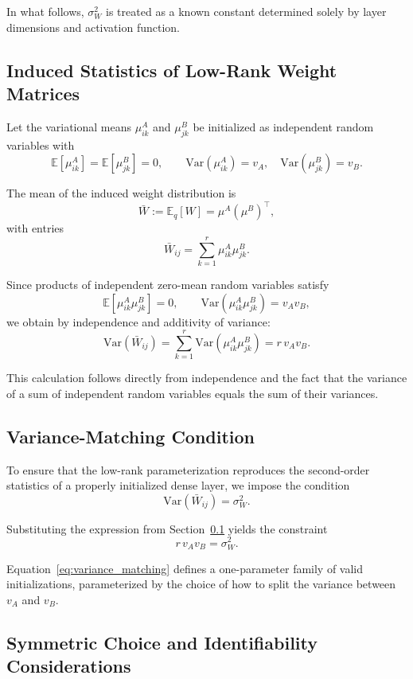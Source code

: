 \documentclass{article}
\theoremstyle{plain}
\theoremstyle{definition}
\theoremstyle{remark}
\begin{document}
In what follows, $\sigma_W^2$ is treated as a known constant determined solely by layer dimensions and activation function.

\subsection{Induced Statistics of Low-Rank Weight Matrices}\label{app:init:induced_stats}

Let the variational means $\mu^A_{ik}$ and $\mu^B_{jk}$ be initialized as independent random variables with
\[
\mathbb{E}[\mu^A_{ik}] = \mathbb{E}[\mu^B_{jk}] = 0,
\qquad
\mathrm{Var}(\mu^A_{ik}) = v_A,
\quad
\mathrm{Var}(\mu^B_{jk}) = v_B.
\]

The mean of the induced weight distribution is
\[
\bar{W} := \mathbb{E}_q[W] = \mu^A (\mu^B)^\top,
\]
with entries
\[
\bar{W}_{ij} = \sum_{k=1}^r \mu^A_{ik} \mu^B_{jk}.
\]

Since products of independent zero-mean random variables satisfy
\[
\mathbb{E}[\mu^A_{ik} \mu^B_{jk}] = 0,
\qquad
\mathrm{Var}(\mu^A_{ik} \mu^B_{jk}) = v_A v_B,
\]
we obtain by independence and additivity of variance:
\[
\mathrm{Var}(\bar{W}_{ij})
= \sum_{k=1}^r \mathrm{Var}(\mu^A_{ik} \mu^B_{jk})
= r \, v_A v_B.
\]

This calculation follows directly from independence and the fact that the variance of a sum of independent random variables equals the sum of their variances.

\subsection{Variance-Matching Condition}\label{app:init:variance_matching}

To ensure that the low-rank parameterization reproduces the second-order statistics of a properly initialized dense layer, we impose the condition
\[
\mathrm{Var}(\bar{W}_{ij}) = \sigma_W^2.
\]

Substituting the expression from Section~\ref{app:init:induced_stats} yields the constraint
\[
r \, v_A v_B = \sigma_W^2.
\tag{VM}
\label{eq:variance_matching}
\]

Equation~\eqref{eq:variance_matching} defines a one-parameter family of valid initializations, parameterized by the choice of how to split the variance between $v_A$ and $v_B$.

\subsection{Symmetric Choice and Identifiability Considerations}\label{app:init:symmetric}
\end{document}
